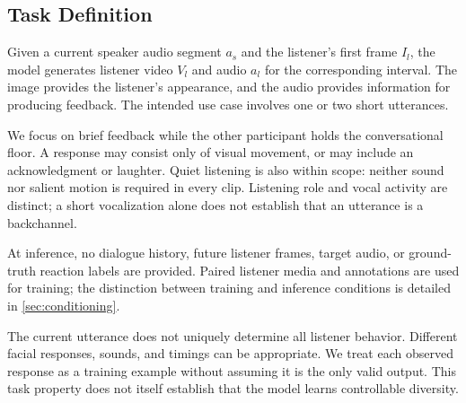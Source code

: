 \subsection{Task Definition}
\label{sec:task}
Given a current speaker audio segment $a_s$ and the listener's first frame $I_l$, the model generates listener video $V_l$ and audio $a_l$ for the corresponding interval. The image provides the listener's appearance, and the audio provides information for producing feedback. The intended use case involves one or two short utterances.

We focus on brief feedback while the other participant holds the conversational floor. A response may consist only of visual movement, or may include an acknowledgment or laughter. Quiet listening is also within scope: neither sound nor salient motion is required in every clip. Listening role and vocal activity are distinct; a short vocalization alone does not establish that an utterance is a backchannel.

At inference, no dialogue history, future listener frames, target audio, or ground-truth reaction labels are provided. Paired listener media and annotations are used for training; the distinction between training and inference conditions is detailed in \cref{sec:conditioning}.

The current utterance does not uniquely determine all listener behavior. Different facial responses, sounds, and timings can be appropriate. We treat each observed response as a training example without assuming it is the only valid output. This task property does not itself establish that the model learns controllable diversity.
